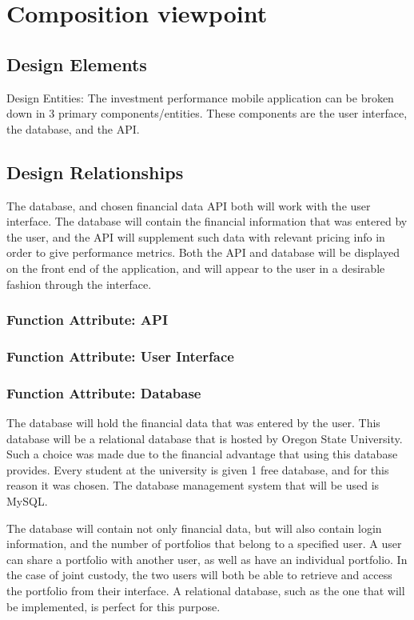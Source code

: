 \documentclass[onecolumn, draftclsnofoot,10pt, compsoc]{IEEEtran}
\begin{document}
\section{Composition viewpoint}
\subsection{Design Elements}
Design Entities: The investment performance mobile application can be broken down in 3 primary components/entities. These components are the user interface, the database, and the API.

\subsection{Design Relationships}
The database, and chosen financial data API both will work with the user interface. The database will contain the financial information that was entered by the user, and the API will supplement such data with relevant pricing info in order to give performance metrics. Both the API and database will be displayed on the front end of the application, and will appear to the user in a desirable fashion through the interface.

\subsubsection{Function Attribute: API}
\subsubsection{Function Attribute: User Interface}
\subsubsection{Function Attribute: Database}
The database will hold the financial data that was entered by the user. This database will be a relational database that is hosted by Oregon State University. Such a choice was made due to the financial advantage that using this database provides. Every student at the university is given 1 free database, and for this reason it was chosen. The database management system that will be used is MySQL.

The database will contain not only financial data, but will also contain login information, and the number of portfolios that belong to a specified user. A user can share a portfolio with another user, as well as have an individual portfolio. In the case of joint custody, the two users will both be able to retrieve and access the portfolio from their interface. A relational database, such as the one that will be implemented, is perfect for this purpose.
\end{document}
